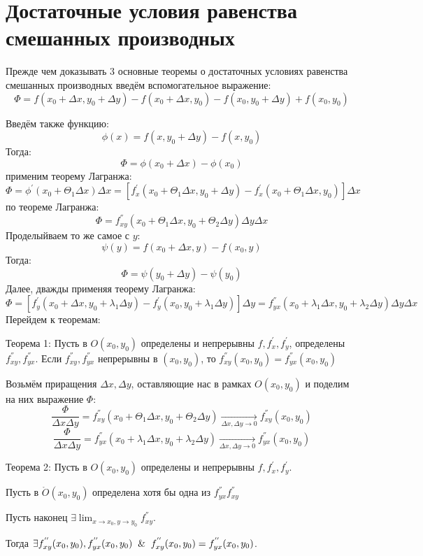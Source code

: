 \documentclass{article}
\begin{document}
\section{Достаточные условия равенства смешанных производных}
Прежде чем доказывать 3 основные теоремы о достаточных условиях равенства смешанных производных введём вспомогательное  выражение: 
$$\Phi = f(x_0 + \Delta x, y_0 + \Delta y) - f(x_0 + \Delta x, y_0) - f(x_0, y_0 + \Delta y) + f(x_0, y_0)$$

Введём также функцию:
$$
\phi (x) = f(x, y_0 + \Delta y) -  f(x, y_0)
$$
Тогда:
$$\Phi = \phi (x_0 + \Delta x) - \phi (x_0)$$
применим теорему Лагранжа:
$$
\Phi = \phi^{'}(x_0 + \Theta_1\Delta x)\Delta x = [f_x^{'}(x_0 + \Theta_1\Delta x, y_0 + \Delta y) - f_x^{'}(x_0 + \Theta_1\Delta x, y_0)]\Delta x
$$  
по теореме Лагранжа:
$$
\Phi = f_{x y}^{''}(x_0 + \Theta_1\Delta x, y_0 + \Theta_2\Delta y)\Delta y \Delta x
$$
Проделыйваем то же самое с $y$: 
$$
\psi (y) = f(x_0 + \Delta x, y) -  f(x_0, y)
$$ 
Тогда:
$$
\Phi = \psi (y_0 + \Delta y) - \psi (y_0)
$$
Далее, дважды применяя теорему Лагранжа:
$$
\Phi = [f_y^{'}(x_0 + \Delta x, y_0 + \lambda_1\Delta y) - f_y^{'}(x_0, y_0+\lambda_1\Delta y)]\Delta y = f_{y x}^{''}(x_0 + \lambda_1\Delta x, y_0 + \lambda_2\Delta y)\Delta y \Delta x
$$
Перейдем к теоремам:
 
Теорема 1: Пусть в $O(x_0, y_0)$ определены и непрерывны $f, f_{x}^{'}, f_{y}^{'}$, определены $f_{x y}^{''}, f_{y x}^{''}$. Если $f_{x y}^{''}, f_{y x}^{''}$ непрерывны в $(x_0, y_0)$, то $f_{x y}^{''}(x_0, y_0) = f_{y x}^{''}(x_0, y_0)$
 
Возьмём приращения $\Delta x, \Delta y$, оставляющие нас в рамках $O(x_0, y_0)$ и поделим на них выражение $\Phi$:
$$
\frac{\Phi}{\Delta x \Delta y} = f_{x y}^{''}(x_0 + \Theta_1\Delta x, y_0 + \Theta_2\Delta y) \underset{\Delta x, \Delta y \to 0}{\longrightarrow} f_{x y}^{''}(x_0, y_0)
$$
$$
\frac{\Phi}{\Delta x \Delta y} = f_{y x}^{''}(x_0 + \lambda_1\Delta x, y_0 + \lambda_2\Delta y) \underset{\Delta x, \Delta y \to 0}{\longrightarrow} f_{y x}^{''}(x_0, y_0)
$$

Теорема 2:  Пусть в $O(x_0, y_0)$ определены и непрерывны $f, f_{x}^{'}, f_{y}^{'}$.

Пусть в $\mathring O(x_0, y_0)$ определена хотя бы одна из $f_{y x}^{''}  f_{x y}^{''} $

Пусть наконец $\exists \lim_{x \to x_0, y \to y_0}{f_{x y}^{''}}$. 

Тогда 
$\exists f_{x y}^{''}(x_0, y_0), f_{y x}^{''}(x_0, y_0) \And f_{x y}^{''}(x_0, y_0) = f_{y x}^{''}(x_0, y_0)$.
\end{document}
